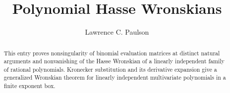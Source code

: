 \documentclass[11pt,a4paper]{article}
\begin{document}
\title{Polynomial Hasse Wronskians}
\author{Lawrence C. Paulson}
\maketitle
\begin{abstract}
This entry proves nonsingularity of binomial evaluation matrices at distinct
natural arguments and nonvanishing of the Hasse Wronskian of a linearly
independent family of rational polynomials. Kronecker substitution and its
derivative expansion give a generalized Wronskian theorem for linearly
independent multivariate polynomials in a finite exponent box.
\end{abstract}
\tableofcontents

\end{document}
